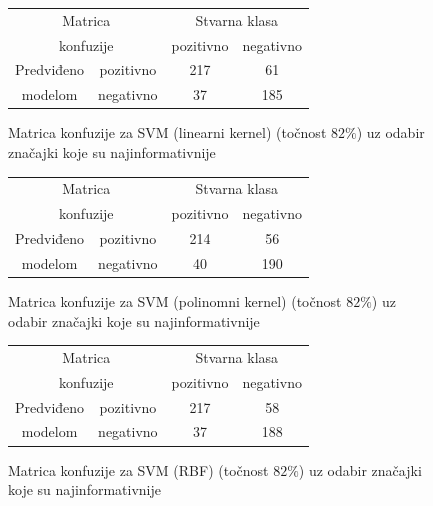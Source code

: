 \documentclass[conference]{IEEEtran}
\begin{document}
\begin{figure}[H]
\begin{minipage}{0.5\textwidth}
\centering
\begin{tabular}{|c|c|c|c|}
  \hline
  \multicolumn{2}{|c|}{Matrica}  & \multicolumn{2}{|c|}{Stvarna klasa} \\ 
  \cline{3-4}
  \multicolumn{2}{|c|}{konfuzije} & pozitivno & negativno \\ 
  \hline
  Predviđeno & pozitivno & 217 & 61 \\
  \cline{2-4}
  modelom & negativno & 37 & 185 \\
  \hline
\end{tabular}
\caption{Matrica konfuzije za SVM (linearni kernel) (točnost $82\%$) uz odabir značajki koje su najinformativnije}
\end{minipage}
\end{figure}

\begin{figure}[H]
\begin{minipage}{0.5\textwidth}
\centering
\begin{tabular}{|c|c|c|c|}
  \hline
  \multicolumn{2}{|c|}{Matrica}  & \multicolumn{2}{|c|}{Stvarna klasa} \\ 
  \cline{3-4}
  \multicolumn{2}{|c|}{konfuzije} & pozitivno & negativno \\ 
  \hline
  Predviđeno & pozitivno & 214 & 56 \\
  \cline{2-4}
  modelom & negativno & 40 & 190 \\
  \hline
\end{tabular}
\caption{Matrica konfuzije za SVM (polinomni kernel) (točnost $82\%$) uz odabir značajki koje su najinformativnije}
\end{minipage}
\end{figure}

\begin{figure}[H]
\begin{minipage}{0.5\textwidth}
\centering
\begin{tabular}{|c|c|c|c|}
  \hline
  \multicolumn{2}{|c|}{Matrica}  & \multicolumn{2}{|c|}{Stvarna klasa} \\ 
  \cline{3-4}
  \multicolumn{2}{|c|}{konfuzije} & pozitivno & negativno \\ 
  \hline
  Predviđeno & pozitivno & 217 & 58 \\
  \cline{2-4}
  modelom & negativno & 37 & 188 \\
  \hline
\end{tabular}
\caption{Matrica konfuzije za SVM (RBF) (točnost $82\%$) uz odabir značajki koje su najinformativnije}
\end{minipage}
\end{figure}
\end{document}
